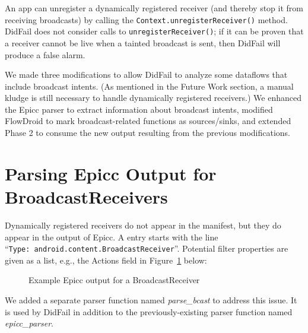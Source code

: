 An app can unregister a dynamically registered receiver (and thereby stop it from receiving broadcasts) by calling the \texttt{Context.unregisterReceiver()} method.  DidFail does not consider calls to \texttt{unregisterReceiver()}; if it can be proven that a receiver cannot be live when a tainted broadcast is sent, then DidFail will produce a false alarm.

We made three modifications to allow DidFail to analyze some dataflows that include broadcast intents. (As mentioned in the Future Work section, a manual kludge is still necessary to handle dynamically registered receivers.) We enhanced the Epicc parser to extract information about broadcast intents, modified FlowDroid to mark broadcast-related functions as sources/sinks, and extended Phase 2 to consume the new output resulting from the previous modifications.

\section{Parsing Epicc Output for BroadcastReceivers}
Dynamically registered receivers do not appear in the manifest, but they do appear in the output of Epicc.  A entry starts with the line ``\texttt{Type:\ android.content.BroadcastReceiver}''.  Potential filter properties are given as a list, e.g., the Actions field in Figure~\ref{fig:bcast_epicc_output} below:

\begin{figure}[!h]
\begin{framed}

\caption{Example Epicc output for a BroadcastReceiver}
\label{fig:bcast_epicc_output}
\end{framed}
\end{figure}

We added a separate parser function named \emph{parse\_bcast} to address this issue. It is used by DidFail in addition to the previously-existing parser function named \emph{epicc\_parser}.

